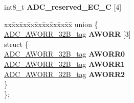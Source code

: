 \begin{DoxyCompactItemize}
\begin{tabbing}
\end{tabbing}\item 
\mbox{\label{structADC__struct__tag_a502fb8aff6d7e2ce71f4f18db659734f}} 
int8\+\_\+t {\bfseries A\+D\+C\+\_\+reserved\+\_\+E\+C\+\_\+C} \mbox{[}4\mbox{]}
\item 
\mbox{\label{structADC__struct__tag_a22cb5a3c114ad503154639377dd53cac}} 
\begin{tabbing}
xx\=xx\=xx\=xx\=xx\=xx\=xx\=xx\=xx\=\kill
union \{\\
\>\mbox{\hyperlink{unionADC__AWORR__32B__tag}{ADC\_AWORR\_32B\_tag}} {\bfseries AWORR} \mbox{[}3\mbox{]}\\
\mbox{\label{unionADC__struct__tag_1_1_0D1836_ab3e5f62a7d88ae2d2d8c31471164d469}} 
\>struct \{\\
\>\>\mbox{\hyperlink{unionADC__AWORR__32B__tag}{ADC\_AWORR\_32B\_tag}} {\bfseries AWORR0}\\
\>\>\mbox{\hyperlink{unionADC__AWORR__32B__tag}{ADC\_AWORR\_32B\_tag}} {\bfseries AWORR1}\\
\>\>\mbox{\hyperlink{unionADC__AWORR__32B__tag}{ADC\_AWORR\_32B\_tag}} {\bfseries AWORR2}\\
\>\} \\
\}; \\


\end{tabbing}
\end{DoxyCompactItemize}
